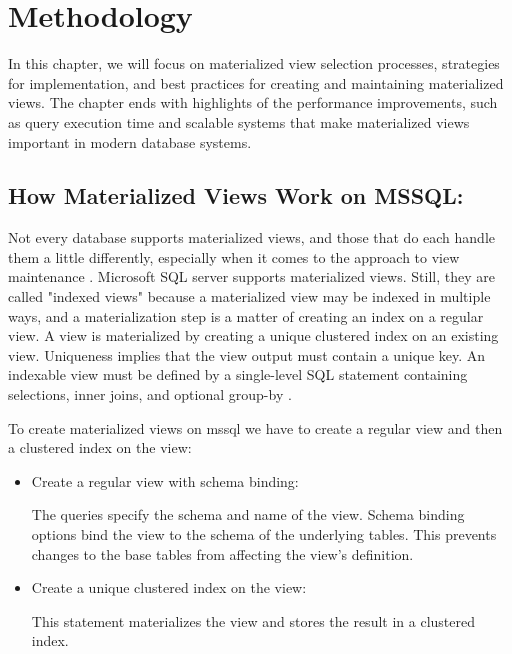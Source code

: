 \section{Methodology}\vspace{.4cm}
In this chapter, we will focus on materialized view selection processes, strategies for implementation, and best practices for creating and maintaining materialized views. The chapter ends with highlights of the performance improvements, such as query execution time and scalable systems that make materialized views important in modern database systems.

 \subsection{How Materialized Views Work on MSSQL:} Not every database supports materialized views, and those that do each handle them a little differently, especially when it comes to the approach to view maintenance \cite{hattemer-2020}. Microsoft SQL server supports materialized views. Still, they are called "indexed views" because a materialized view may be indexed in multiple ways, and a materialization step is a matter of creating an index on a regular view. A view is materialized by creating a unique clustered index on an existing view. Uniqueness implies that the view output must contain a unique key. An indexable view must be defined by a single-level SQL statement containing selections, inner joins, and optional group-by \cite{goldstein-2001}.\vspace{0.8cm}

 To create materialized views on mssql we have to create a  regular view and then a clustered index on the view:
 \begin{itemize}
     \item {Create a regular view with schema binding:}\vspace{0.4cm}
     

The queries specify the schema and name of the view. Schema binding options bind the view to the schema of the underlying tables. This prevents changes to the base tables from affecting the view's definition.
      \item {Create a unique clustered index on the view:}\vspace{0.4cm}
      
 \vspace{0.4cm}

This statement materializes the view and stores the result in a clustered index.
\end{itemize}



